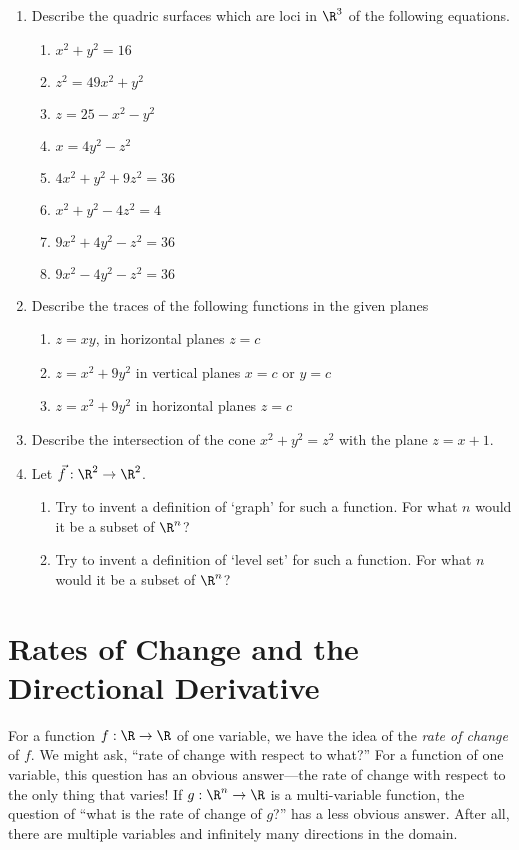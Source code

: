 \begin{exercises}
\begin{enumerate}
	\item   Describe the quadric surfaces which are loci in $\R^3$
	of the following equations. 
	\begin{enumerate}
		\item $x^2 + y^2 = 16$ 
		\item $z^2 = 49x^2 + y^2$ 
		\item $z= 25 - x^2 - y^2$ 
		\item $x=4y^2-z^2$ 
		\item $4x^2 + y^2 + 9z^2 = 36$ 
		\item $x^2 + y^2 - 4z^2 = 4$ 
		\item $9x^2 + 4y^2 -z^2 = 36$ 
		\item $9x^2 - 4y^2 - z^2 = 36$
	\end{enumerate}

	\item   Describe the traces of the following functions in the given planes
	\begin{enumerate}
		\item $z=xy$, in horizontal planes  $z = c$ 
		\item $z=x^2+9y^2$ in vertical planes $x = c$ or $y = c$ 
		\item $z=x^2+9y^2$ in horizontal planes  $z = c$
	\end{enumerate}

	\item   Describe the intersection of the cone $x^2 + y^2 = z^2$ with
	the plane $z = x + 1$.  

	\item   Let $\vec f:\R^2 \to \R^2$.  
	\begin{enumerate}
		\item Try to invent a definition of `graph' for such a function.   For
		    what $n$ would it be a subset of $\R^n$? 
		\item Try to invent a definition of `level set' for such a function.
		    For what $n$ would it be a subset of $\R^n$?
	\end{enumerate}

\end{enumerate}
\end{exercises}

\section{Rates of Change and the Directional Derivative}
	
For a function $f:\R\to\R$ of one variable, we have the idea of
the \emph{rate of change} of $f$.  We might ask, ``rate of change with
respect to what?''  For a function of one variable, this question has an obvious
answer---the rate of change with respect to the only thing that varies!
If $g:\R^n\to\R$ is a multi-variable function, the question of ``what is the rate of change
of $g$?'' has a less obvious answer.  After all, there are multiple variables and
infinitely many directions in the domain.


